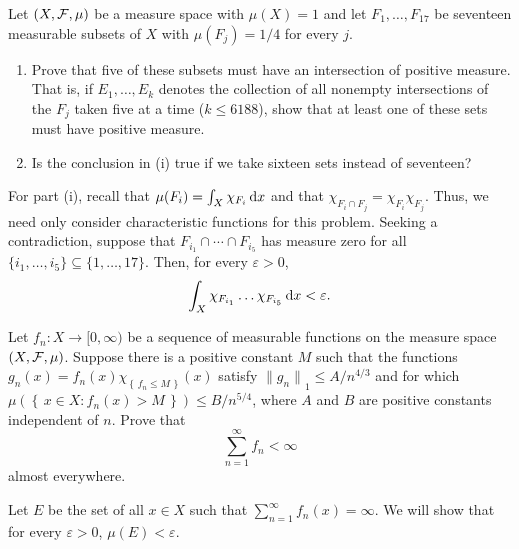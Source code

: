 \begin{problem}
  Let $(X,\mathcal{F},\mu)$ be a measure space with $\mu(X)=1$ and let
  $F_1,\ldots,F_{17}$ be seventeen measurable subsets of $X$ with
  $\mu(F_j)=1/4$ for every $j$.
  \begin{enumerate}[label=(\roman*),noitemsep]
  \item Prove that five of these subsets must have an intersection of
    positive measure. That is, if $E_1,\ldots,E_k$ denotes the collection
    of all nonempty intersections of the $F_j$ taken five at a time ($k\leq
    6188$), show that at least one of these sets must have positive
    measure.
  \item Is the conclusion in (i) true if we take sixteen sets instead of
    seventeen?
  \end{enumerate}
\end{problem}
\begin{solution}
  For part (i), recall that $\mu(F_i)=\int_X\chi_{F_i}\mathop{}\!\mathrm{d} x$ and that
  $\chi_{F_i\cap F_j}=\chi_{F_i}\chi_{F_j}$. Thus, we need only consider
  characteristic functions for this problem. Seeking a contradiction,
  suppose that $F_{i_1}\cap\cdots\cap F_{i_5}$ has measure zero for all
  $\{i_1,\ldots,i_5\}\subseteq\{1,\ldots,17\}$. Then, for every
  $\varepsilon>0$,
  \[
    \int_X\chi_{F_{i_1}}\ldots\chi_{F_{i_5}}\mathop{}\!\mathrm{d} x<\varepsilon.
  \]
\end{solution}

\begin{problem}
  Let $f_n\colon X\to[0,\infty)$ be a sequence of measurable functions on
  the measure space $(X,\mathcal{F},\mu)$. Suppose there is a positive constant
  $M$ such that the functions
  $g_n(x)=f_n
  (x)\chi_{\left\{\,f_n\leq M\,\right\}}(x)$ satisfy
  ${\|g_n\|}_1\leq A/n^{4/3}$ and for which
  $\mu\left(\left\{\,x\in X:f_n(x)>M\,\right\}\right)\leq B/n^{5/4}$, where
  $A$ and $B$ are positive constants independent of $n$. Prove that
  \[
    \sum_{n=1}^\infty f_n<\infty
  \]
  almost everywhere.
\end{problem}
\begin{solution}
  Let $E$ be the set of all $x\in X$ such that $\sum_{n=1}^\infty
  f_n(x)=\infty$. We will show that for every $\varepsilon>0$,
  $\mu(E)<\varepsilon$.
\end{solution}


